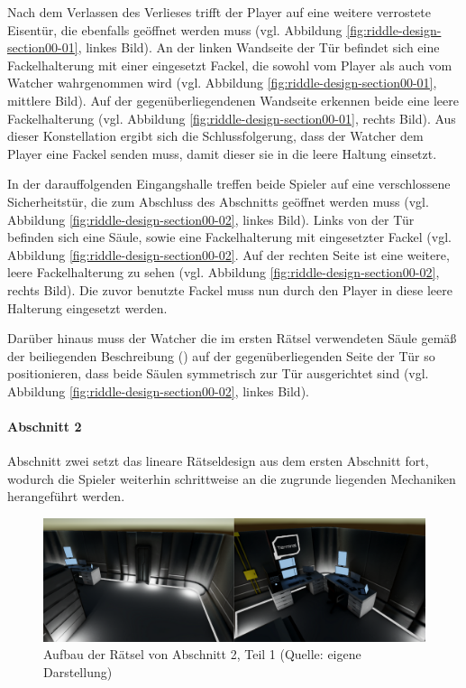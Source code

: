 Nach dem Verlassen des Verlieses trifft der Player auf eine weitere verrostete Eisentür, die ebenfalls geöffnet werden muss (vgl. Abbildung \ref{fig:riddle-design-section00-01}, linkes Bild). An der linken Wandseite der Tür befindet sich eine Fackelhalterung mit einer eingesetzt Fackel, die sowohl vom Player als auch vom Watcher wahrgenommen wird (vgl. Abbildung \ref{fig:riddle-design-section00-01}, mittlere Bild). Auf der gegenüberliegendenen Wandseite erkennen beide eine leere Fackelhalterung (vgl. Abbildung \ref{fig:riddle-design-section00-01}, rechts Bild). Aus dieser Konstellation ergibt sich die Schlussfolgerung, dass der Watcher dem Player eine Fackel senden muss, damit dieser sie in die leere Haltung einsetzt.

In der darauffolgenden Eingangshalle treffen beide Spieler auf eine verschlossene Sicherheitstür, die zum Abschluss des Abschnitts geöffnet werden muss (vgl. Abbildung \ref{fig:riddle-design-section00-02}, linkes Bild). Links von der Tür befinden sich eine Säule, sowie eine Fackelhalterung mit eingesetzter Fackel (vgl. Abbildung \ref{fig:riddle-design-section00-02}. Auf der rechten Seite ist eine weitere, leere Fackelhalterung zu sehen (vgl. Abbildung \ref{fig:riddle-design-section00-02}, rechts Bild). Die zuvor benutzte Fackel muss nun durch den Player in diese leere Halterung eingesetzt werden.

Darüber hinaus muss der Watcher die im ersten Rätsel verwendeten Säule gemäß der beiliegenden Beschreibung () auf der gegenüberliegenden Seite der Tür so positionieren, dass beide Säulen symmetrisch zur Tür ausgerichtet sind (vgl. Abbildung \ref{fig:riddle-design-section00-02}, linkes Bild).

\paragraph{Abschnitt 2}

Abschnitt zwei setzt das lineare Rätseldesign aus dem ersten Abschnitt fort, wodurch die Spieler weiterhin schrittweise an die zugrunde liegenden Mechaniken herangeführt werden.

\begin{figure}[ht]
\centering
\includegraphics[width=1\linewidth]{content/pictures/Rätseldesign - Abschnitt01 - Rätsel00.png}
\caption{Aufbau der Rätsel von Abschnitt 2, Teil 1 (Quelle: eigene Darstellung)}
\label{fig:riddle-design-section01-00}
\end{figure}

